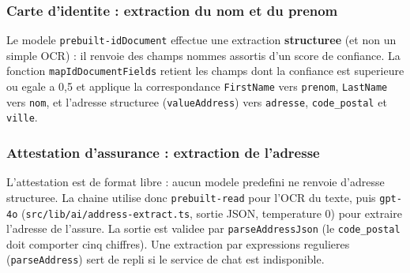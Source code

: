 \documentclass[11pt,a4paper]{article}
\begin{document}
\subsubsection{Carte d'identite : extraction du nom et du prenom}
Le modele \texttt{prebuilt-idDocument} effectue une extraction \textbf{structuree}
(et non un simple OCR) : il renvoie des champs nommes assortis d'un score de
confiance. La fonction \texttt{mapIdDocumentFields} retient les champs dont la
confiance est superieure ou egale a 0,5 et applique la correspondance
\texttt{FirstName} vers \texttt{prenom}, \texttt{LastName} vers \texttt{nom}, et
l'adresse structuree (\texttt{valueAddress}) vers \texttt{adresse},
\texttt{code\_postal} et \texttt{ville}.

\begin{center}
\end{center}

\subsubsection{Attestation d'assurance : extraction de l'adresse}
L'attestation est de format libre : aucun modele predefini ne renvoie d'adresse
structuree. La chaine utilise donc \texttt{prebuilt-read} pour l'OCR du texte,
puis \texttt{gpt-4o} (\texttt{src/lib/ai/address-extract.ts}, sortie JSON,
temperature 0) pour extraire l'adresse de l'assure. La sortie est validee par
\texttt{parseAddressJson} (le \texttt{code\_postal} doit comporter cinq chiffres).
Une extraction par expressions regulieres (\texttt{parseAddress}) sert de repli
si le service de chat est indisponible.
\end{document}
